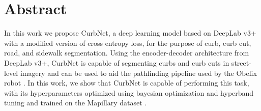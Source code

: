 \chapter*{Abstract}
In this work we propose CurbNet, a deep learning model based on DeepLab v3+ \cite{deeplab} with a modified version of cross entropy loss, for the purpose of curb, curb cut, road, and sidewalk segmentation.
Using the encoder-decoder architecture from DeepLab v3+, CurbNet is capable of segmenting curbs and curb cuts in street-level imagery and can be used to aid the pathfinding pipeline used by the Obelix robot \cite{europa}.
In this work, we show that CurbNet is capable of performing this task, with its hyperparameters optimized using bayesian optimization and hyperband tuning \cite{bohb} and trained on the Mapillary dataset \cite{mapillary}.